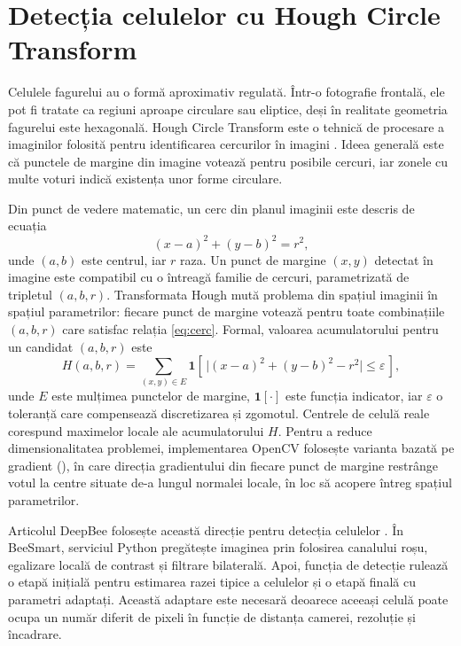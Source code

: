 \section{Detecția celulelor cu Hough Circle Transform}

Celulele fagurelui au o formă aproximativ regulată. Într-o fotografie frontală, ele pot fi tratate ca regiuni aproape circulare sau eliptice, deși în realitate geometria fagurelui este hexagonală. Hough Circle Transform este o tehnică de procesare a imaginilor folosită pentru identificarea cercurilor în imagini \cite{opencvDocs}. Ideea generală este că punctele de margine din imagine votează pentru posibile cercuri, iar zonele cu multe voturi indică existența unor forme circulare.

Din punct de vedere matematic, un cerc din planul imaginii este descris de ecuația
\begin{equation}
	(x - a)^2 + (y - b)^2 = r^2,
	\label{eq:cerc}
\end{equation}
unde $(a, b)$ este centrul, iar $r$ raza. Un punct de margine $(x, y)$ detectat în imagine este compatibil cu o întreagă familie de cercuri, parametrizată de tripletul $(a, b, r)$. Transformata Hough mută problema din spațiul imaginii în spațiul parametrilor: fiecare punct de margine votează pentru toate combinațiile $(a, b, r)$ care satisfac relația \eqref{eq:cerc}. Formal, valoarea acumulatorului pentru un candidat $(a, b, r)$ este
\begin{equation}
	H(a, b, r) = \sum_{(x, y) \in E} \mathbf{1}\!\left[\, \bigl| (x - a)^2 + (y - b)^2 - r^2 \bigr| \le \varepsilon \,\right],
	\label{eq:hough-acumulator}
\end{equation}
unde $E$ este mulțimea punctelor de margine, $\mathbf{1}[\cdot]$ este funcția indicator, iar $\varepsilon$ o toleranță care compensează discretizarea și zgomotul. Centrele de celulă reale corespund maximelor locale ale acumulatorului $H$. Pentru a reduce dimensionalitatea problemei, implementarea OpenCV folosește varianta bazată pe gradient (), în care direcția gradientului din fiecare punct de margine restrânge votul la centre situate de-a lungul normalei locale, în loc să acopere întreg spațiul parametrilor.

Articolul DeepBee folosește această direcție pentru detecția celulelor \cite{deepbeeArticle}. În BeeSmart, serviciul Python pregătește imaginea prin folosirea canalului roșu, egalizare locală de contrast și filtrare bilaterală. Apoi, funcția de detecție rulează o etapă inițială pentru estimarea razei tipice a celulelor și o etapă finală cu parametri adaptați. Această adaptare este necesară deoarece aceeași celulă poate ocupa un număr diferit de pixeli în funcție de distanța camerei, rezoluție și încadrare.


